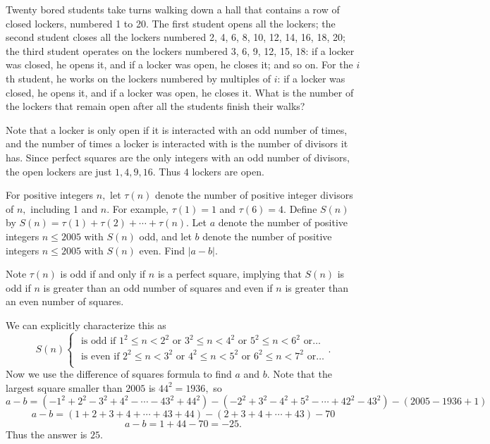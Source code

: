 \documentclass[blue,onecol]{shooting}
\begin{document}
\begin{exam}[104 NT]
Twenty bored students take turns walking down a hall that contains a row of closed lockers, numbered 1 to 20. The first student opens all the lockers; the second student closes all the lockers numbered 2, 4, 6, 8, 10, 12, 14, 16, 18, 20; the third student operates on the lockers numbered 3, 6, 9, 12, 15, 18: if a locker was closed, he opens it, and if a locker was open, he closes it; and so on. For the $i$th student, he works on the lockers numbered by multiples of $i$: if a locker was closed, he opens it, and if a locker was open, he closes it. What is the number of the lockers that remain open after all the students finish their walks?
\end{exam}

\begin{sol}
Note that a locker is only open if it is interacted with an odd number of times, and the number of times a locker is interacted with is the number of divisors it has. Since perfect squares are the only integers with an odd number of divisors, the open lockers are just $1,4,9,16.$ Thus $4$ lockers are open.
\end{sol}

\begin{exam}[AIME I 2005/12]
For positive integers $n,$ let $\tau (n)$ denote the number of positive integer divisors of $n,$ including 1 and $n.$ For example, $\tau (1)=1$ and $\tau(6) =4.$ Define $S(n)$ by $S(n)=\tau(1)+ \tau(2) + \cdots + \tau(n).$ Let $a$ denote the number of positive integers $n \leq 2005$ with $S(n)$ odd, and let $b$ denote the number of positive integers $n \leq 2005$ with $S(n)$ even. Find $|a-b|.$
\end{exam}
\begin{sol}
Note $\tau(n)$ is odd if and only if $n$ is a perfect square, implying that $S(n)$ is odd if $n$ is greater than an odd number of squares and even if $n$ is greater than an even number of squares.
    
We can explicitly characterize this as
\[S(n)\begin{cases}
\text{ is odd if } 1^2\leq n<2^2 \text{ or } 3^2\leq n<4^2 \text{ or } 5^2\leq n< 6^2 \text{ or} \ldots \\
\text{ is even if } 2^2\leq n<3^2 \text{ or } 4^2\leq n<5^2 \text{ or } 6^2\leq n< 7^2 \text{ or} \ldots \\
\end{cases}.\]
Now we use the difference of squares formula to find $a$ and $b.$ Note that the largest square smaller than $2005$ is $44^2=1936,$ so
\[a-b=(-1^2+2^2-3^2+4^2-\cdots-43^2+44^2)-(-2^2+3^2-4^2+5^2-\cdots+42^2-43^2)-(2005-1936+1)\]
\[a-b=(1+2+3+4+\cdots+43+44)-(2+3+4+\cdots+43)-70\]
\[a-b=1+44-70=-25.\]
Thus the answer is $25.$
\end{sol}
\end{document}
